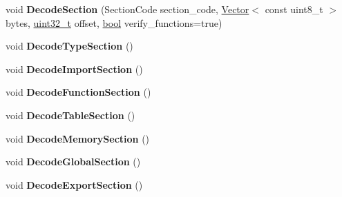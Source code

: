 \begin{DoxyCompactItemize}
\item 
\mbox{\label{classv8_1_1internal_1_1wasm_1_1ModuleDecoderImpl_a8a82ea09b7640cdaf7db2833e1eedecb}} 
void {\bfseries Decode\+Section} (Section\+Code section\+\_\+code, \mbox{\hyperlink{classv8_1_1internal_1_1Vector}{Vector}}$<$ const uint8\+\_\+t $>$ bytes, \mbox{\hyperlink{classuint32__t}{uint32\+\_\+t}} offset, \mbox{\hyperlink{classbool}{bool}} verify\+\_\+functions=true)
\item 
\mbox{\label{classv8_1_1internal_1_1wasm_1_1ModuleDecoderImpl_aaf3de70701483e97ffb790c2e7e73613}} 
void {\bfseries Decode\+Type\+Section} ()
\item 
\mbox{\label{classv8_1_1internal_1_1wasm_1_1ModuleDecoderImpl_a9f520395afe16b1911acde386b5a4752}} 
void {\bfseries Decode\+Import\+Section} ()
\item 
\mbox{\label{classv8_1_1internal_1_1wasm_1_1ModuleDecoderImpl_a1677fae3b0de1b332c98e3e8bdb58768}} 
void {\bfseries Decode\+Function\+Section} ()
\item 
\mbox{\label{classv8_1_1internal_1_1wasm_1_1ModuleDecoderImpl_acfa82dc467d1c90e5069773fe8659502}} 
void {\bfseries Decode\+Table\+Section} ()
\item 
\mbox{\label{classv8_1_1internal_1_1wasm_1_1ModuleDecoderImpl_aa17e842def6953634a99d8730b5f9129}} 
void {\bfseries Decode\+Memory\+Section} ()
\item 
\mbox{\label{classv8_1_1internal_1_1wasm_1_1ModuleDecoderImpl_af448c4b0b623da69ea54244677f82485}} 
void {\bfseries Decode\+Global\+Section} ()
\item 
\mbox{\label{classv8_1_1internal_1_1wasm_1_1ModuleDecoderImpl_adf9ff203dd8dd0859f5f56eb41b924ce}} 
void {\bfseries Decode\+Export\+Section} ()
\item 
\mbox{\label{classv8_1_1internal_1_1wasm_1_1ModuleDecoderImpl_a0b4d7f999d6d54a1cb7dedfcf3e0188b}} 

\end{DoxyCompactItemize}

